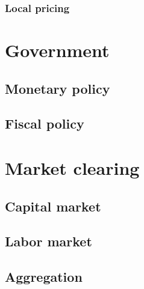 %

\renewcommand{\XCP}{local}
\subsubsection{Local pricing}


\section{Government}

\subsection{Monetary policy}


\subsection{Fiscal policy}


\section{Market clearing}

\subsection{Capital market}


\subsection{Labor market}


\subsection{Aggregation}


